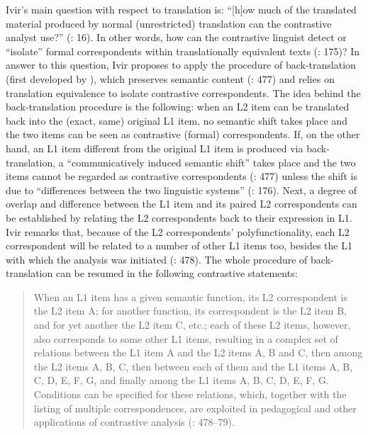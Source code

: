 Ivir’s main question with respect to translation is: “[h]ow much of the translated material produced by normal (unrestricted) translation can the contrastive analyst use?” (\citealt{ivir_contrasting_1969}: 16). In other words, how can the contrastive linguist detect or “isolate” formal correspondents within translationally equivalent texts (\citealt{ivir_translation-based_1983}: 175)? In answer to this question, Ivir proposes to apply the procedure of back-translation (first developed by \citet{spalatin_contrastive_1967}), which preserves semantic content (\citealt{dirven_functionalism_1987}: 477) and relies on translation equivalence to isolate contrastive correspondents. The idea behind the back-translation procedure is the following: when an L2 item can be translated back into the (exact, same) original L1 item, no semantic shift takes place and the two items can be seen as contrastive (formal) correspondents. If, on the other hand, an L1 item different from the original L1 item is produced via back-translation, a “communicatively induced semantic shift” takes place and the two items cannot be regarded as contrastive correspondents (\citealt{dirven_functionalism_1987}: 477) unless the shift is due to “differences between the two linguistic systems” (\citealt{ivir_translation-based_1983}: 176). Next, a degree of overlap and difference between the L1 item and its paired L2 correspondents can be established by relating the L2 correspondents back to their expression in L1. Ivir remarks that, because of the L2 correspondents’ polyfunctionality, each L2 correspondent will be related to a number of other L1 items too, besides the L1 with which the analysis was initiated (\citealt{dirven_functionalism_1987}: 478). The whole procedure of back-translation can be resumed in the following contrastive statements:


\begin{quote}
When an L1 item has a given semantic function, its L2 correspondent is the L2 item A; for another function, its correspondent is the L2 item B, and for yet another the L2 item C, etc.; each of these L2 items, however, also corresponds to some other L1 items, resulting in a complex set of relations between the L1 item A and the L2 items A, B and C, then among the L2 items A, B, C, then between each of them and the L1 items A, B, C, D, E, F, G, and finally among the L1 items A, B, C, D, E, F, G. Conditions can be specified for these relations, which, together with the listing of multiple correspondences, are exploited in pedagogical and other applications of contrastive analysis (\citealt{dirven_functionalism_1987}: 478–79).
\end{quote}


